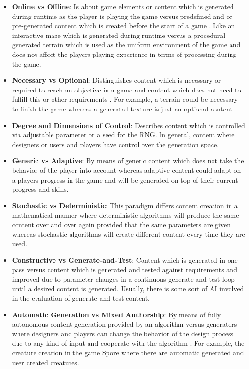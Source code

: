 \documentclass[MGS,Master,english]{twbook}%
\begin{document}
\begin{itemize}
	\item \textbf{Online vs Offline}: Is about game elements or content which is generated during runtime as the player is playing the game versus predefined and or pre-generated content which is created before the start of a game \cite{pcg::book}. Like an interactive maze which is generated during runtime versus a procedural generated terrain which is used as the uniform environment of the game and does not affect the players playing experience in terms of processing during the game.
	\item \textbf{Necessary vs Optional}: Distinguishes content which is necessary or required to reach an objective in a game and content which does not need to fulfill this or other requirements \cite{pcg::book}. For example, a terrain could be necessary to finish the game whereas a generated texture is just an optional content.
	\item \textbf{Degree and Dimensions of Control}: Describes content which is controlled via adjustable parameter or a seed for the \ac{RNG}. In general, content where designers or users and players have control over the generation space. \cite{pcg::book}
	\item \textbf{Generic vs Adaptive}: By means of generic content which does not take the behavior of the player into account whereas adaptive content could adapt on a players progress in the game and will be generated on top of their current progress and skills. \cite{pcg::book}
	\item \textbf{Stochastic vs Deterministic}: This paradigm differs content creation in a mathematical manner where deterministic algorithms will produce the same content over and over again provided that the same parameters are given whereas stochastic algorithms will create different content every time they are used. \cite{pcg::book}
	\item \textbf{Constructive vs Generate-and-Test}: Content which is generated in one pass versus content which is generated and tested against requirements and improved due to parameter changes in a continuous generate and test loop until a desired content is generated. Usually, there is some sort of \ac{AI} involved in the evaluation of generate-and-test content. \cite{pcg::book}
	\item \textbf{Automatic Generation vs Mixed Authorship}: By means of fully autonomous content generation provided by an algorithm versus generators where designers and players can change the behavior of the design process due to any kind of input and cooperate with the algorithm \cite{pcg::book}. For example, the creature creation in the game Spore where there are automatic generated and user created creatures.
\end{itemize}
\end{document}
